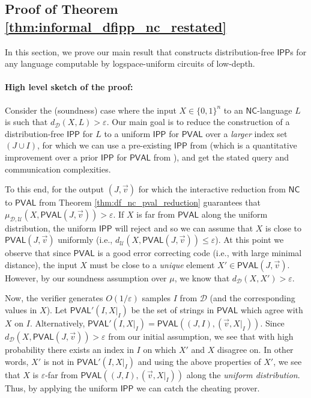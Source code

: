 \documentclass[11pt]{article}
\newcommand{\NC}{\mathsf{NC}}
\newcommand{\PVAL}{\mathsf{PVAL}}
\newcommand{\IPP}{\mathsf{IPP}}
\newcommand{\sU}{\mathcal{U}}
\newcommand{\sD}{\mathcal{D}}
\begin{document}
\subsection{Proof of Theorem \ref{thm:informal_dfipp_nc_restated}}
\label{sec:proof_main_dfipp}
In this section, we prove our main result that constructs distribution-free $\IPP$s for any language computable by logspace-uniform circuits of low-depth. 

\paragraph*{High level sketch of the proof:} Consider the (soundness) case where the input $X \in \{0,1\}^n$ to an $\NC$-language $L$ is such that $d_{\sD}(X,L)>\varepsilon$. Our main goal is to reduce the construction of a distribution-free $\IPP$ for $L$ to a uniform $\IPP$ for $\PVAL$ over a \textit{larger} index set $(J \cup I)$, for which we can use a pre-existing $\IPP$ from \cite{RR20_batch_polylog} (which is a quantitative improvement over a prior $\IPP$ for $\PVAL$ from \cite{RVW}), and get the stated query and communication complexities.

To this end, for the output $(J,\vec{v})$ for which the interactive reduction from $\NC$ to $\PVAL$ from Theorem \ref{thm:df_nc_pval_reduction} guarantees that $\mu_{\sD, \mathcal{U}}(X,\PVAL(J,\Vec{v})) > \varepsilon$. If $X$ is far from $\PVAL$ along the uniform distribution, the uniform $\IPP$ will reject and so we can assume that $X$ is close to $\PVAL(J,\vec{v})$ uniformly (i.e., $d_{\sU}(X,\PVAL(J,\vec{v}))\leq \varepsilon$). 
At this point we observe that since $\PVAL$ is a good error correcting code (i.e., with large minimal distance), the input $X$ must be close to a \emph{unique} element $X' \in \PVAL(J,\vec{v})$. However, by our soundness assumption over $\mu$, we know that $d_{\sD}(X,X')>\varepsilon$.

Now, the verifier generates $O(1/\varepsilon)$ samples $I$ from $\sD$ (and the corresponding values in $X$). Let $\PVAL'(I, X \vert_I)$ be the set of strings in $\PVAL$ which agree with $X$ on $I$. Alternatively, $\PVAL'(I, X \vert_I) = \PVAL((J, I), (\Vec{v},X \vert_I))$. Since $d_\sD(X,\PVAL(J,\Vec{v})) > \varepsilon$ from our initial assumption, we see that with high probability there exists an index in $I$ on which $X'$ and $X$ disagree on. In other words, $X'$ is not in $\PVAL'(I, X \vert_I)$ and using the above properties of $X'$, we see that $X$ is $\varepsilon$-far from $\PVAL((J, I), (\Vec{v},X \vert_I))$ along the \textit{uniform distribution}. Thus, by applying the uniform $\IPP$ we can catch the cheating prover.
\end{document}
